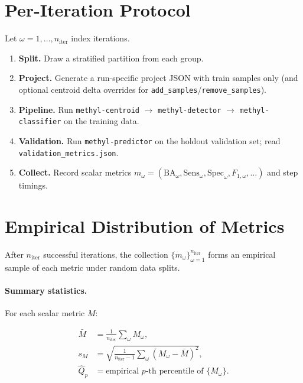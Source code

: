 \documentclass[11pt]{article}
\begin{document}
\section{Per-Iteration Protocol}

Let $\omega = 1, \ldots, n_\mathrm{iter}$ index iterations.

\begin{enumerate}
  \item \textbf{Split.}  Draw a stratified partition from each group.
  \item \textbf{Project.}  Generate a run-specific project JSON with train
        samples only (and optional centroid delta overrides for
        \texttt{add\_samples}/\texttt{remove\_samples}).
  \item \textbf{Pipeline.}  Run
        \texttt{methyl-centroid} $\to$ \texttt{methyl-detector} $\to$
        \texttt{methyl-classifier} on the training data.
  \item \textbf{Validation.}  Run \texttt{methyl-predictor} on the holdout
        validation set; read \texttt{validation\_metrics.json}.
  \item \textbf{Collect.}  Record scalar metrics
        $m_\omega = (\mathrm{BA}_\omega, \mathrm{Sens}_\omega,
                    \mathrm{Spec}_\omega, F_{1,\omega}, \ldots)$
        and step timings.
\end{enumerate}

\section{Empirical Distribution of Metrics}

After $n_\mathrm{iter}$ successful iterations, the collection
$\{m_\omega\}_{\omega=1}^{n_\mathrm{iter}}$ forms an empirical sample of
each metric under random data splits.

\paragraph{Summary statistics.}

For each scalar metric $M$:

\begin{align}
  \bar{M} &= \frac{1}{n_\mathrm{iter}} \sum_\omega M_\omega, \\[4pt]
  s_M &= \sqrt{\frac{1}{n_\mathrm{iter}-1}
               \sum_\omega (M_\omega - \bar{M})^2}, \\[4pt]
  \hat{Q}_p &= \text{empirical } p\text{-th percentile of } \{M_\omega\}.
\end{align}
\end{document}
